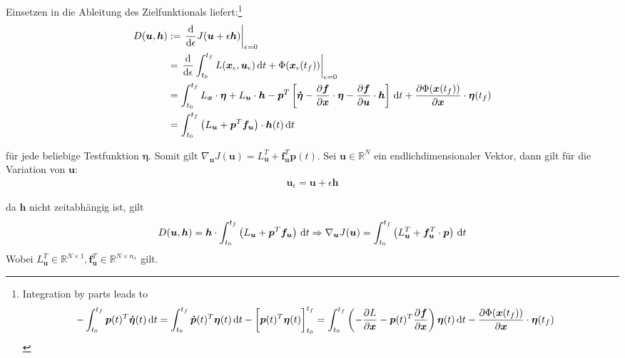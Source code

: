 \documentclass[a4paper, 12pt]{scrartcl}
\newcommand{\dt}{\thinspace \mathrm{d}t}
\begin{document}
Einsetzen in die Ableitung des Zielfunktionals liefert:\footnote{
    Integration by parts leads to
    \begin{align*}
        - \int_{t_0}^{t_f} \bm{p}(t)^T \bm{\dot{\eta}}(t) \dt
        &=
        \int_{t_0}^{t_f} \bm{\dot{p}}(t)^T \bm{\eta}(t) \dt 
        -
        \left[
            \vphantom{\int}
            \bm{p}(t)^T \bm{\eta}(t)
        \right]_{t_0}^{t_f}
        =
        \int_{t_0}^{t_f} 
        \left(
            - \frac{\partial L}{\partial \bm{x}} 
            - 
            \bm{p}(t)^T \frac{\partial \bm{f}}{\partial \bm{x}}
        \right)  
        \bm{\eta}(t) \dt 
        -
        \frac{\partial \Phi(\bm{x}(t_f))}{\partial \bm{x}} \cdot \bm{\eta}(t_f)
    \end{align*}
}
%
\begin{align*}
    D(\bm{u},\bm{h})
    &:=
    \left. 
        \frac{\mathrm{d}}{\mathrm{d}\epsilon} 
        J(\bm{u} + \epsilon \bm{h}) 
    \right|_{\epsilon=0} 
    \\
    &= 
    \left.
        \frac{\mathrm{d}}{\mathrm{d}\epsilon} 
        \int_{t_0}^{t_f} L(\bm{x}_\epsilon, \bm{u}_\epsilon) \dt + \Phi(\bm{x}_\epsilon(t_f))
    \right|_{\epsilon=0}
    \\
    &=
    \int_{t_0}^{t_f} 
    L_{\bm{x}} \cdot \bm{\eta}
    + 
    L_{\bm{u}} \cdot \bm{h}
    - 
    \bm{p}^T
    \left[
        \bm{\dot{\eta}} 
        -
        \frac{\partial \bm{f}}{\partial \bm{x}} \cdot \bm{\eta}
        -
        \frac{\partial \bm{f}}{\partial \bm{u}} \cdot \bm{h}
    \right]
    \dt 
    + \frac{\partial \Phi(\bm{x}(t_f))}{\partial \bm{x}} \cdot \bm{\eta}(t_f)
    \\
    &=
    \int_{t_0}^{t_f} 
    \left(
        L_{\bm{u}} + \bm{p}^T \bm{f}_{\bm{u}} 
    \right)
    \cdot \bm{h}(t)
    \dt 
\end{align*}

für jede beliebige Testfunktion $\bm{\eta}$. Somit gilt 
$\nabla_{\bm{u}} J(\bm{u}) = L_{\bm{u}}^T + \bm{f}_{\bm{u}}^T \bm{p}(t)$. 
Sei $\bm{u}\in \mathbb{R}^N$ ein endlichdimensionaler Vektor, dann gilt für die Variation von $\bm{u}$:
%
\begin{align*}
    \bm{u}_\epsilon = \bm{u} + \epsilon \bm{h} 
\end{align*}

da $\bm{h}$ nicht zeitabhängig ist, gilt 
%
\begin{align*}
    D(\bm{u},\bm{h})
    =
    \bm{h} \cdot
    \int_{t_0}^{t_f} 
    \left(
        L_{\bm{u}} + \bm{p}^T \bm{f}_{\bm{u}} 
    \right)
    \dt 
    \Rightarrow
    \nabla_{\bm{u}} J(\bm{u}) =
    \int_{t_0}^{t_f} 
    \left(
        L_{\bm{u}}^T
        +
        \bm{f}_{\bm{u}}^T \cdot \bm{p}
    \right)
    \dt
\end{align*}
%
Wobei $L_{\bm{u}}^T \in \mathbb{R}^{N \times 1}, \bm{f}_{\bm{u}}^T \in \mathbb{R}^{N \times n_x}$ gilt.
\end{document}
